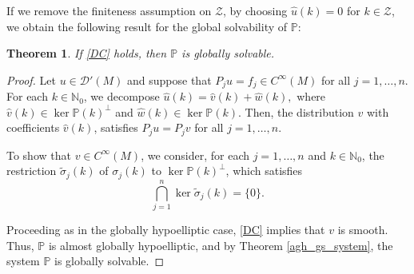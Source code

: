\documentclass{amsart}
\newtheorem{theorem}{Theorem}[section]
\theoremstyle{definition}
\theoremstyle{remark}
\numberwithin{equation}{section}
\begin{document}
	If we remove the finiteness assumption on $\mathcal{Z}$, by choosing $\widehat{u}(k)=0$ for $k\in\mathcal{Z}$, we obtain the following result for the global solvability of $\mathbb{P}$:
	
	\begin{theorem}\label{gs_system_normal}
		If \eqref{DC} holds, then $\mathbb{P}$ is globally solvable.
	\end{theorem}
	
	\begin{proof}
		Let $u\in\mathscr{D}'(M)$ and suppose that $P_ju=f_j\in C^\infty(M)$ for all $j=1,\dots,n$. For each $k\in\mathbb{N}_0$, we decompose $\widehat{u}(k) = \widehat{v}(k)+\widehat{w}(k),$ where $\widehat{v}(k)\in\ker\mathbb{P}(k)^\perp$ and $\widehat{w}(k)\in\ker\mathbb{P}(k)$. Then, the distribution $v$ with coefficients $\widehat{v}(k)$, satisfies $P_ju=P_jv$ for all $j=1,\dots,n$.
		
		To show that $v\in C^\infty(M)$, we consider, for each $j=1,\dots,n$ and $k\in\mathbb{N}_0$, the restriction $\tilde\sigma_j(k)$ of $\sigma_j(k)$ to $\ker\mathbb{P}(k)^\perp$, which satisfies  
		\begin{equation*}
			\bigcap_{j=1}^n\ker\tilde\sigma_j(k)=\{0\}.
		\end{equation*}
		
		Proceeding as in the globally hypoelliptic case, \eqref{DC} implies that  $v$ is smooth. Thus, $\mathbb{P}$ is almost globally hypoelliptic, and by Theorem \ref{agh_gs_system}, the system $\mathbb{P}$ is globally solvable.
	\end{proof}
	
\end{document}
